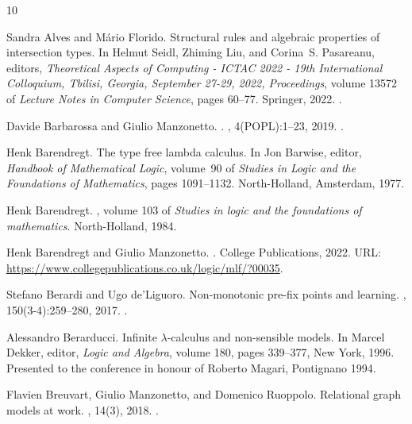 \documentclass[10pt,a4paper]{amsart}
\theoremstyle{definition}
\begin{document}
\begin{thebibliography}{10}

Sandra Alves and M{\'{a}}rio Florido.
\newblock Structural rules and algebraic properties of intersection types.
\newblock In Helmut Seidl, Zhiming Liu, and Corina~S. Pasareanu, editors, {\em
  Theoretical Aspects of Computing - {ICTAC} 2022 - 19th International
  Colloquium, Tbilisi, Georgia, September 27-29, 2022, Proceedings}, volume
  13572 of {\em Lecture Notes in Computer Science}, pages 60--77. Springer,
  2022.
\newblock \href {https://doi.org/10.1007/978-3-031-17715-6\_6}
  {}.

Davide Barbarossa and Giulio Manzonetto.
.
, 4(POPL):1--23,
  2019.
\newblock \href {https://doi.org/10.1145/3371069} {}.

Henk Barendregt.
\newblock The type free lambda calculus.
\newblock In Jon Barwise, editor, {\em Handbook of Mathematical Logic},
  volume~90 of {\em Studies in Logic and the Foundations of Mathematics}, pages
  1091--1132. North-Holland, Amsterdam, 1977.

Henk Barendregt.
, volume 103 of
  {\em Studies in logic and the foundations of mathematics}.
\newblock North-Holland, 1984.

Henk Barendregt and Giulio Manzonetto.
.
\newblock College Publications, 2022.
\newblock URL: \url{https://www.collegepublications.co.uk/logic/mlf/?00035}.

Stefano Berardi and Ugo de'Liguoro.
\newblock Non-monotonic pre-fix points and learning.
, 150(3-4):259--280, 2017.
\newblock \href {https://doi.org/10.3233/FI-2017-1470}
  {}.

Alessandro Berarducci.
\newblock Infinite $\lambda$-calculus and non-sensible models.
\newblock In Marcel Dekker, editor, {\em Logic and Algebra}, volume 180, pages
  339--377, New York, 1996.
\newblock Presented to the conference in honour of Roberto Magari, Pontignano
  1994.

Flavien Breuvart, Giulio Manzonetto, and Domenico Ruoppolo.
\newblock Relational graph models at work.
, 14(3), 2018.
\newblock \href {https://doi.org/10.23638/LMCS-14(3:2)2018}
  {}.


\end{thebibliography}
\end{document}
